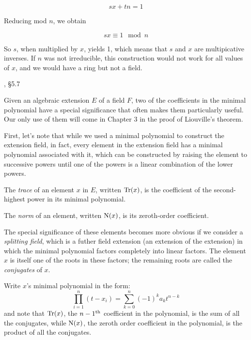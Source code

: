 $$sx + tn = 1$$

Reducing mod $n$, we obtain

$$sx \equiv 1 \mod n$$

So $s$, when multiplied by $x$, yields 1, which means
that $s$ and $x$ are multipicative inverses.
If $n$ was not irreducible, this construction would
not work for all values of $x$, and we would have
a ring but not a field.

\begin{comment}
Again, like with the quotient field, I tend to be a bit loose with the
notation.  Something like the Gaussian integers, which I wrote as
${\bf Z}[i]; i^2=-1$, really should be expressed as equivalence
classes modulo the polynomial $i^2+1$, i.e.  ${\bf Z}[i]/(i^2+1)$.
\end{comment}


, \S5.7

Given an algebraic extension $E$ of a field $F$, two of the
coefficients in the minimal polynomial have a special significance
that often makes them particularly useful.  Our only use of them will
come in Chapter 3 in the proof of Liouville's theorem.

First, let's note that while we used a minimal polynomial to
construct the extension field,
in fact, every element in the extension field
has a minimal polynomial associated with it,
which can be constructed by raising the element to successive
powers until one of the powers is a linear combination
of the lower powers.

The {\it trace} of an
element $x$ in $E$, written ${\rm Tr}(x)$, is the coefficient
of the second-highest power in its minimal polynomial.
\enddefinition

The {\it norm} of an element, written ${\rm N}(x)$, is its zeroth-order coefficient.
\enddefinition

The special significance of these elements becomes more obvious if we
consider a {\it splitting field}, which is a futher field extension
(an extension of the extension) in which the minimal polynomial
factors completely into linear factors.  The element $x$ is
itself one of the roots in these factors; the remaining
roots are called the {\it conjugates} of $x$.

Write $x$'s minimal polynomial in the form:
$$\prod_{i=1}^n \left( t - x_i \right) = \sum_{k=0}^n (-1)^{k} a_k t^{n-k}$$
and note that ${\rm Tr}(x)$, the $n-1^{\rm th}$ coefficient in the polynomial,
is the sum of all the conjugates, while ${\rm N}(x)$, the zeroth order
coefficient in the polynomial, is the product of all the conjugates.

